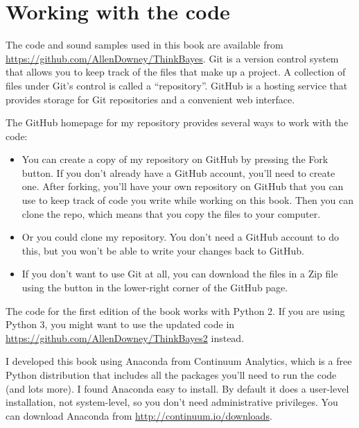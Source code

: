 \documentclass[12pt]{book}
\begin{document}
\section{Working with the code}
\label{download}

The code and sound samples used in this book are available from
\url{https://github.com/AllenDowney/ThinkBayes}.  Git is a version
control system that allows you to keep track of the files that
make up a project.  A collection of files under Git's control is
called a ``repository''.  GitHub is a hosting service that provides
storage for Git repositories and a convenient web interface.

The GitHub homepage for my repository provides several ways to
work with the code:

\begin{itemize}

\item You can create a copy of my repository
on GitHub by pressing the {\sf Fork} button.  If you don't already
have a GitHub account, you'll need to create one.  After forking, you'll
have your own repository on GitHub that you can use to keep track
of code you write while working on this book.  Then you can
clone the repo, which means that you copy the files
to your computer.

\item Or you could clone
my repository.  You don't need a GitHub account to do this, but you
won't be able to write your changes back to GitHub.

\item If you don't want to use Git at all, you can download the files
in a Zip file using the button in the lower-right corner of the
GitHub page.

\end{itemize}

The code for the first edition of the book works with Python 2.
If you are using Python 3, you might want to use the updated code
in \url{https://github.com/AllenDowney/ThinkBayes2} instead.

I developed this book using Anaconda from
Continuum Analytics, which is a free Python distribution that includes
all the packages you'll need to run the code (and lots more).
I found Anaconda easy to install.  By default it does a user-level
installation, not system-level, so you don't need administrative
privileges.  You can
download Anaconda from \url{http://continuum.io/downloads}.
\end{document}
